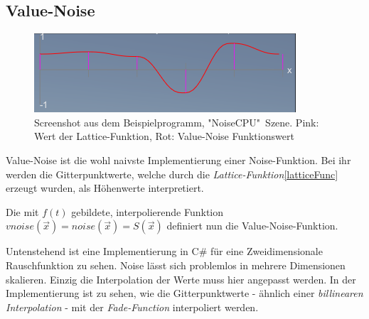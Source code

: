 \subsection{Value-Noise}\label{Value-Noise}
\begin{figure}[!ht]%
	\centering
	\includegraphics[width=\textwidth]{images/vnoise.png}
	\caption{Screenshot aus dem Beispielprogramm, "NoiseCPU"\ Szene. Pink: Wert der Lattice-Funktion, Rot: Value-Noise Funktionswert}\label{img.vnoise}
\end{figure}
Value-Noise ist die wohl naivste Implementierung einer Noise-Funktion. Bei ihr werden die Gitterpunktwerte, welche durch die \emph{Lattice-Funktion}\ref{latticeFunc} erzeugt wurden, als Höhenwerte interpretiert.

Die mit $f(t)$ gebildete, interpolierende Funktion $vnoise(\vec{x}) = noise(\vec{x}) = S(\vec{x})$ definiert nun die Value-Noise-Funktion.

Untenstehend ist eine Implementierung in C\# für eine Zweidimensionale Rauschfunktion zu sehen.
Noise lässt sich problemlos in mehrere Dimensionen skalieren. Einzig die Interpolation der Werte muss hier angepasst werden. In der Implementierung ist zu sehen, wie die Gitterpunktwerte - ähnlich einer \emph{billinearen Interpolation} - mit der \emph{Fade-Function} interpoliert werden.

\label{valueNoise.cs}

\newpage
